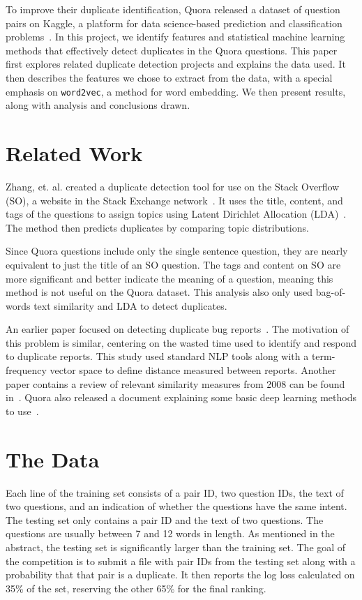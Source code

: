 \documentclass{article} %
\newcommand{\wordtvec}{\texttt{word2vec}}
\begin{document}
	To improve their duplicate identification, Quora released a dataset of question pairs on Kaggle, a platform for data science-based prediction and classification problems~\cite{kaggleComp}. In this project, we identify features and statistical machine learning methods that effectively detect duplicates in the Quora questions. This paper first explores related duplicate detection projects and explains the data used. It then describes the features we chose to extract from the data, with a special emphasis on \wordtvec, a method for word embedding. We then present results, along with analysis and conclusions drawn. 
	
	\section{Related Work}
	
	Zhang, et. al. created a duplicate detection tool for use on the Stack Overflow (SO), a website in the Stack Exchange network~\cite{Zhang2015}. It uses the title, content, and tags of the questions to assign topics using Latent Dirichlet Allocation (LDA)~\cite{Blei03}. The method then predicts duplicates by comparing topic distributions.
	
	Since Quora questions include only the single sentence question, they are nearly equivalent to just the title of an SO question. The tags and content on SO are more significant and better indicate the meaning of a question, meaning this method is not useful on the Quora dataset. This analysis also only used bag-of-words text similarity and LDA to detect duplicates.
	
	An earlier paper focused on detecting duplicate bug reports~\cite{Runeson2007}. The motivation of this problem is similar, centering on the wasted time used to identify and respond to duplicate reports. This study used standard NLP tools along with a term-frequency vector space to define distance measured between reports. Another paper contains a review of relevant similarity measures from 2008 can be found in~\cite{acha08}. Quora also released a document explaining some basic deep learning methods to use~\cite{quora_eng}.
	
	\section{The Data}
	
	Each line of the training set consists of a pair ID, two question IDs, the text of two questions, and an indication of whether the questions have the same intent. The testing set only contains a pair ID and the text of two questions. The questions are usually between 7 and 12 words in length. As mentioned in the abstract, the testing set is significantly larger than the training set. The goal of the competition is to submit a file with pair IDs from the testing set along with a probability that that pair is a duplicate. It then reports the log loss calculated on 35\% of the set, reserving the other 65\% for the final ranking.
	
\end{document}
